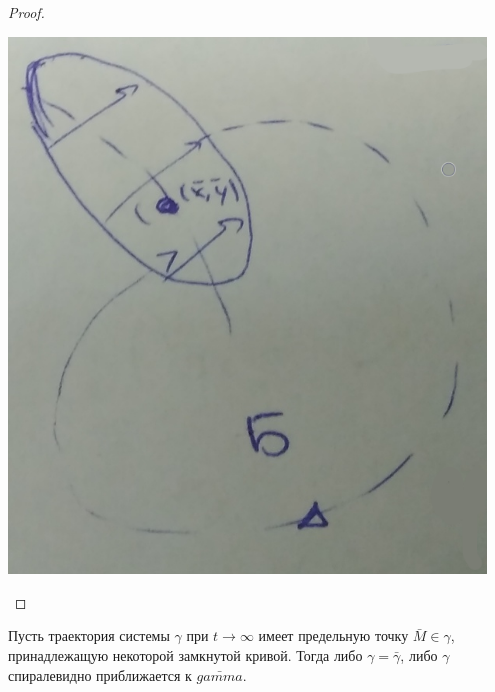 \begin{proof}
\begin{itemize}
\begin{minipage}{0.24\textwidth}
				\begin{center} \includegraphics[width=0.95\textwidth]{ch8/pict/pict_9_2.png} \vspace{5mm}\end{center} 
			\end{minipage}
				
		\end{itemize}		
		
	\end{proof}
	\noindent
	\begin{lemma}
		Пусть траектория системы $\gamma$ при $t\rightarrow \infty$ имеет предельную точку $\bar{M}\in\gamma$, 
		принадлежащую некоторой замкнутой кривой. Тогда либо $\gamma = \bar{\gamma}$, либо $\gamma$ 
		спиралевидно приближается к $\bar{gamma}.$
	\end{lemma}
